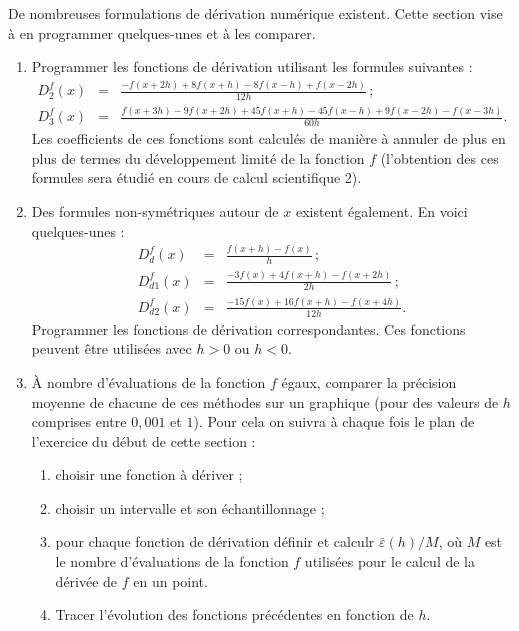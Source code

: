 De  nombreuses  formulations  de  dérivation  numérique  existent.  Cette
section vise à en programmer quelques-unes et à les comparer.
\begin{enumerate}
\item Programmer les fonctions de dérivation utilisant les formules suivantes :
  \begin{eqnarray*}
 D^f_2(x) &=& \frac{-f(x+2h)+8f(x+h)-8f(x-h)+f(x-2h)}{12h}\,; \\
  D^f_3(x)&=&\frac{f(x+3h)-9f(x+2h)+45f(x+h)-45f(x-h)+9f(x-2h)-f(x-3h)}{60h}.
  \end{eqnarray*}
Les coefficients de ces fonctions sont calculés de manière à annuler de plus en
plus de termes du développement limité de la fonction $f$ (l'obtention des ces formules
sera étudié en cours de
calcul scientifique 2).
\item Des formules non-symétriques autour de $x$ existent également. En voici quelques-unes :
   \begin{eqnarray*}
D_d^f(x) &=& \frac{f(x+h)-f(x)}{h}\,;\\
D_{d1}^f(x) &=& \frac{-3f(x)+4f(x+h) -f(x+2h)}{2h}\,;\\
D_{d2}^f(x) &=& \frac{-15f(x)+16f(x+h) -f(x+4h)}{12h}.
  \end{eqnarray*}
 Programmer les fonctions de dérivation correspondantes. Ces fonctions peuvent être utilisées avec $h>0$ ou $h<0$.
\item  {\sc [facultatif]} À nombre  d'évaluations de  la fonction  $f$ égaux,  comparer la
  précision moyenne de chacune de  ces méthodes sur un graphique (pour
  des valeurs de $h$ comprises entre $0,001$ et $1$). Pour cela on suivra à chaque fois le plan de l'exercice du
  début de cette section :
  \begin{enumerate}
  \item choisir une fonction à dériver ;
  \item choisir un intervalle et son échantillonnage ;    
  \item pour chaque fonction de dérivation définir et calculr  
    $\bar{\varepsilon}(h)/M$, où $M$ est le nombre d'évaluations de
    la fonction $f$ utilisées pour le calcul de la dérivée de $f$ en
    un point.
  \item Tracer l'évolution des fonctions précédentes en fonction de $h$. 
    \end{enumerate}
\end{enumerate}



